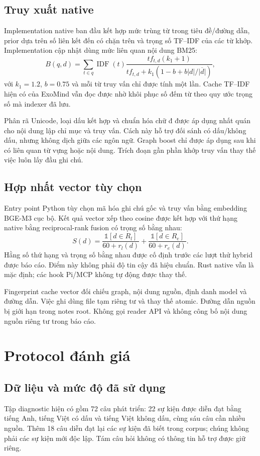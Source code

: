 \documentclass[conference]{IEEEtran}
\begin{document}
\subsection{Truy xuất native}
Implementation native ban đầu kết hợp mức trùng từ trong tiêu đề/đường dẫn, prior dựa trên số liên kết đến có chặn trên và trọng số TF--IDF của các từ khớp. Implementation cập nhật dùng mức liên quan nội dung BM25:
\begin{equation}
B(q,d)=\sum_{t\in q}\operatorname{IDF}(t)
\frac{tf_{t,d}(k_1+1)}{tf_{t,d}+k_1(1-b+b|d|/\overline{|d|})},
\end{equation}
với $k_1=1.2$, $b=0.75$ và mỗi từ truy vấn chỉ được tính một lần. Cache TF--IDF hiện có của ExoMind vẫn đọc được nhờ khôi phục số đếm từ theo quy ước trọng số mà indexer đã lưu.

Phân rã Unicode, loại dấu kết hợp và chuẩn hóa chữ đ được áp dụng nhất quán cho nội dung lập chỉ mục và truy vấn. Cách này hỗ trợ đối sánh có dấu/không dấu, nhưng không dịch giữa các ngôn ngữ. Graph boost chỉ được áp dụng sau khi có liên quan từ vựng hoặc nội dung. Trích đoạn gần phần khớp truy vấn thay thế việc luôn lấy đầu ghi chú.

\subsection{Hợp nhất vector tùy chọn}
Entry point Python tùy chọn mã hóa ghi chú gốc và truy vấn bằng embedding BGE-M3 cục bộ. Kết quả vector xếp theo cosine được kết hợp với thứ hạng native bằng reciprocal-rank fusion có trọng số bằng nhau:
\begin{equation}
S(d)=\frac{\mathbb{1}[d\in R_l]}{60+r_l(d)}+
\frac{\mathbb{1}[d\in R_e]}{60+r_e(d)}.
\end{equation}
Hằng số thứ hạng và trọng số bằng nhau được cố định trước các lượt thử hybrid được báo cáo. Điểm này không phải độ tin cậy đã hiệu chuẩn. Rust native vẫn là mặc định; các hook Pi/MCP không tự động được thay thế.

Fingerprint cache vector đối chiếu graph, nội dung nguồn, định danh model và đường dẫn. Việc ghi dùng file tạm riêng tư và thay thế atomic. Đường dẫn nguồn bị giới hạn trong notes root. Không gọi reader API và không công bố nội dung nguồn riêng tư trong báo cáo.

\section{Protocol đánh giá}
\subsection{Dữ liệu và mức độ đã sử dụng}
Tập diagnostic hiện có gồm 72 câu phát triển: 22 sự kiện được diễn đạt bằng tiếng Anh, tiếng Việt có dấu và tiếng Việt không dấu, cùng sáu câu cần nhiều nguồn. Thêm 18 câu diễn đạt lại các sự kiện đã biết trong corpus; chúng không phải các sự kiện mới độc lập. Tám câu hỏi không có thông tin hỗ trợ được giữ riêng.
\end{document}
